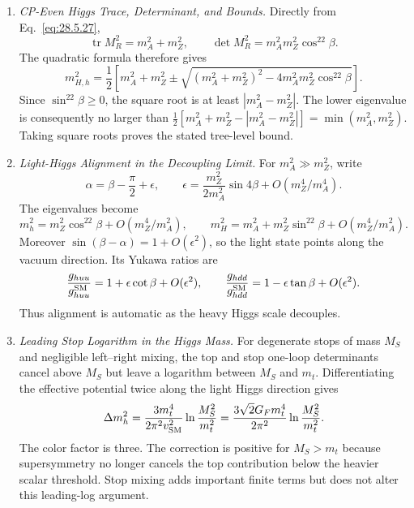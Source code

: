 \begin{enumerate}
  \begin{enumerate}
    \item \emph{CP-Even Higgs Trace, Determinant, and Bounds.}
    Directly from Eq.~\eqref{eq:28.5.27},
      \[
        \operatorname{tr}M_R^2=m_A^2+m_Z^2,\qquad
        \det M_R^2=m_A^2m_Z^2\cos^22\beta.
      \]
      The quadratic formula therefore gives
      \[
        m_{H,h}^2=\frac12\left[
          m_A^2+m_Z^2
          \mathbin{\pm}
          \sqrt{(m_A^2+m_Z^2)^2
            -4m_A^2m_Z^2\cos^22\beta}
        \right].
      \]
      Since \(\sin^22\beta\geq0\), the square root is at least
      \(|m_A^2-m_Z^2|\).  The lower eigenvalue is consequently no larger
      than
      \(\tfrac12[m_A^2+m_Z^2-|m_A^2-m_Z^2|]
      =\min(m_A^2,m_Z^2)\).  Taking square roots proves the stated
      tree-level bound.
    \item \emph{Light-Higgs Alignment in the Decoupling Limit.}
    For \(m_A^2\gg m_Z^2\), write
      \[
        \alpha=\beta-\frac{\pi}{2}+\epsilon,\qquad
        \epsilon=\frac{m_Z^2}{2m_A^2}\sin4\beta
          +O(m_Z^4/m_A^4).
      \]
      The eigenvalues become
      \[
        m_h^2=m_Z^2\cos^22\beta+O(m_Z^4/m_A^2),\qquad
        m_H^2=m_A^2+m_Z^2\sin^22\beta+O(m_Z^4/m_A^2).
      \]
      Moreover \(\sin(\beta-\alpha)=1+O(\epsilon^2)\), so the light state
      points along the vacuum direction.  Its Yukawa ratios are
      \[
        \frac{g_{huu}}{g_{huu}^{\rm SM}}
          =1+\epsilon\cot\beta+O(\epsilon^2),\qquad
        \frac{g_{hdd}}{g_{hdd}^{\rm SM}}
          =1-\epsilon\tan\beta+O(\epsilon^2).
      \]
      Thus alignment is automatic as the heavy Higgs scale decouples.
    \item \emph{Leading Stop Logarithm in the Higgs Mass.}
    For degenerate stops of mass \(M_S\) and negligible left--right mixing,
      the top and stop one-loop determinants cancel above \(M_S\) but leave a
      logarithm between \(M_S\) and \(m_t\).  Differentiating the effective
      potential twice along the light Higgs direction gives
      \[
        \Delta m_h^2
          =\frac{3m_t^4}{2\pi^2v_{\rm SM}^2}
            \ln\frac{M_S^2}{m_t^2}
          =\frac{3\sqrt2G_Fm_t^4}{2\pi^2}
            \ln\frac{M_S^2}{m_t^2}.
      \]
      The color factor is three.  The correction is positive for
      \(M_S>m_t\) because supersymmetry no longer cancels the top contribution
      below the heavier scalar threshold.  Stop mixing adds important finite
      terms but does not alter this leading-log argument.
  \end{enumerate}


\end{enumerate}

